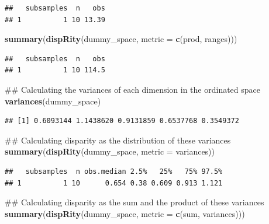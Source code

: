 \documentclass[]{book}
\newenvironment{Shaded}{\begin{snugshade}}{\end{snugshade}}
\newcommand{\KeywordTok}[1]{\textcolor[rgb]{0.13,0.29,0.53}{\textbf{#1}}}
\newcommand{\DataTypeTok}[1]{\textcolor[rgb]{0.13,0.29,0.53}{#1}}
\newcommand{\NormalTok}[1]{#1}
\theoremstyle{definition}
\theoremstyle{definition}
\theoremstyle{remark}
\begin{document}
\begin{verbatim}
##   subsamples  n   obs
## 1          1 10 13.39
\end{verbatim}

\begin{Shaded}
\begin{Highlighting}[]
\KeywordTok{summary}\NormalTok{(}\KeywordTok{dispRity}\NormalTok{(dummy_space, }\DataTypeTok{metric =} \KeywordTok{c}\NormalTok{(prod, ranges)))}
\end{Highlighting}
\end{Shaded}

\begin{verbatim}
##   subsamples  n   obs
## 1          1 10 114.5
\end{verbatim}

\begin{Shaded}
\begin{Highlighting}[]
\NormalTok{## Calculating the variances of each dimension in the ordinated space}
\KeywordTok{variances}\NormalTok{(dummy_space)}
\end{Highlighting}
\end{Shaded}

\begin{verbatim}
## [1] 0.6093144 1.1438620 0.9131859 0.6537768 0.3549372
\end{verbatim}

\begin{Shaded}
\begin{Highlighting}[]
\NormalTok{## Calculating disparity as the distribution of these variances}
\KeywordTok{summary}\NormalTok{(}\KeywordTok{dispRity}\NormalTok{(dummy_space, }\DataTypeTok{metric =}\NormalTok{ variances))}
\end{Highlighting}
\end{Shaded}

\begin{verbatim}
##   subsamples  n obs.median 2.5%   25%   75% 97.5%
## 1          1 10      0.654 0.38 0.609 0.913 1.121
\end{verbatim}

\begin{Shaded}
\begin{Highlighting}[]
\NormalTok{## Calculating disparity as the sum and the product of these variances}
\KeywordTok{summary}\NormalTok{(}\KeywordTok{dispRity}\NormalTok{(dummy_space, }\DataTypeTok{metric =} \KeywordTok{c}\NormalTok{(sum, variances)))}
\end{Highlighting}
\end{Shaded}
\end{document}
